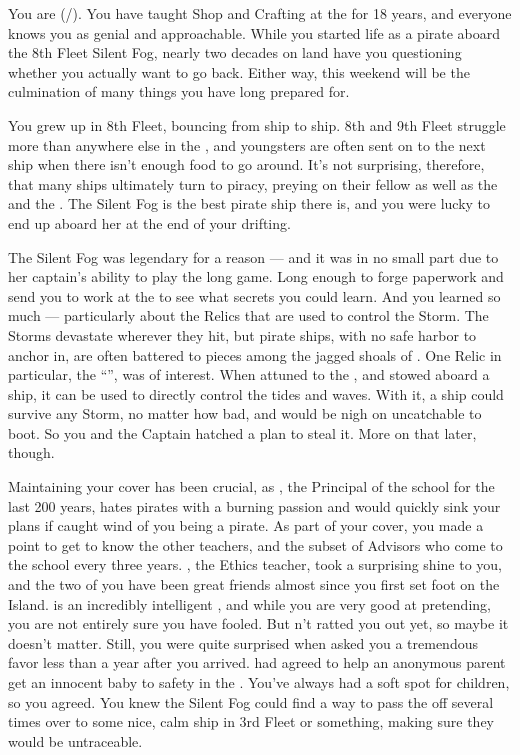 \documentclass[char]{GL2020}
\begin{document}
\name{\cPirate{}}

You are \cPirate{\full} (\cPirate{\they}/\cPirate{\them}). You have taught Shop and Crafting at the \pSchool{} for 18 years, and everyone knows you as genial and approachable. While you started life as a pirate aboard the 8th Fleet Silent Fog, nearly two decades on land have you questioning whether you actually want to go back. Either way, this weekend will be the culmination of many things you have long prepared for.

You grew up in 8th Fleet, bouncing from ship to ship. 8th and 9th Fleet struggle more than anywhere else in the \pShip{}, and youngsters are often sent on to the next ship when there isn't enough food to go around. It's not surprising, therefore, that many ships ultimately turn to piracy, preying on their fellow \pShippies{} as well as the \pFarm{} and the \pTech{}. The Silent Fog is the best pirate ship there is, and you were lucky to end up aboard her at the end of your drifting.

The Silent Fog was legendary for a reason — and it was in no small part due to her captain's ability to play the long game. Long enough to forge paperwork and send you to work at the \pSchool{} to see what secrets you could learn. And you learned so much — particularly about the Relics that are used to control the Storm. The Storms devastate wherever they hit, but pirate ships, with no safe harbor to anchor in, are often battered to pieces among the jagged shoals of \pWod{}. One Relic in particular, the ``\iNet{}'', was of interest. When attuned to the \pShip{}, and stowed aboard a ship, it can be used to directly control the tides and waves. With it, a ship could survive any Storm, no matter how bad, and would be nigh on uncatchable to boot. So you and the Captain hatched a plan to steal it. More on that later, though.

Maintaining your cover has been crucial, as \cPrincipal{\full}, the Principal of the school for the last 200 years, hates pirates with a burning passion and would quickly sink your plans if \cPrincipal{\they} caught wind of you being a pirate. As part of your cover, you made a point to get to know the other teachers, and the subset of Advisors who come to the school every three years. \cEthics{\full}, the Ethics teacher, took a surprising shine to you, and the two of you have been great friends almost since you first set foot on the Island. \cEthics{} is an incredibly intelligent \cEthics{\person}, and while you are very good at pretending, you are not entirely sure you have \cEthics{\them} fooled. But \cEthics{\theyhave}n't ratted you out yet, so maybe it doesn't matter. Still, you were quite surprised when \cEthics{\they} asked you a tremendous favor less than a year after you arrived. \cEthics{} had agreed to help an anonymous parent get an innocent baby to safety in the \pShip{}. You've always had a soft spot for children, so you agreed. You knew the Silent Fog could find a way to pass the \cPirateChild{\child} off several times over to some nice, calm ship in 3rd Fleet or something, making sure they would be untraceable.
\end{document}
